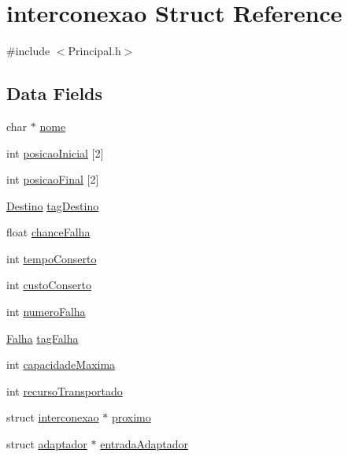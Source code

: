 \hypertarget{structinterconexao}{\section{interconexao Struct Reference}
\label{structinterconexao}
}


{\ttfamily \#include $<$Principal.\-h$>$}

\subsection*{Data Fields}
\begin{DoxyCompactItemize}
\item 
char $\ast$ \hyperlink{structinterconexao_ae2a0f66178bb1c4d42e2b70ec9426ccb}{nome}
\item 
int \hyperlink{structinterconexao_a2584a890a5daa3979c8f5def66b37a93}{posicao\-Inicial} \mbox{[}2\mbox{]}
\item 
int \hyperlink{structinterconexao_a744a0aae2f2c8216f4e62181f4eef596}{posicao\-Final} \mbox{[}2\mbox{]}
\item 
\hyperlink{_principal_8h_a25b25bd9b7208df5558e2c89bb31469f}{Destino} \hyperlink{structinterconexao_a14094f7ac62c8b911b9218533444f891}{tag\-Destino}
\item 
float \hyperlink{structinterconexao_aa8ab52bccf94e202dc5c2b5c6a1c031b}{chance\-Falha}
\item 
int \hyperlink{structinterconexao_aadac5447051c1979a90f047e50e1119f}{tempo\-Conserto}
\item 
int \hyperlink{structinterconexao_aa3f746c0d39f7be1ecded1e29cf8dc9a}{custo\-Conserto}
\item 
int \hyperlink{structinterconexao_a131582956c0866fc51a6855fef6a3cb5}{numero\-Falha}
\item 
\hyperlink{_principal_8h_ab80478651cd53bf69168abd99c5b2afb}{Falha} \hyperlink{structinterconexao_ab6bff15141ec55edeb4370cdee3fe3d8}{tag\-Falha}
\item 
int \hyperlink{structinterconexao_abe24567e8cdbfefa8ffa9d6911078a7a}{capacidade\-Maxima}
\item 
int \hyperlink{structinterconexao_aa7760e925040fa4b54d3a847e27c0f82}{recurso\-Transportado}
\item 
struct \hyperlink{structinterconexao}{interconexao} $\ast$ \hyperlink{structinterconexao_a1cf2ab988ac89d1e06938f7149fb2b39}{proximo}
\item 
struct \hyperlink{structadaptador}{adaptador} $\ast$ \hyperlink{structinterconexao_a14e2e66fac149b7994e268306d30326f}{entrada\-Adaptador}

\end{DoxyCompactItemize}
